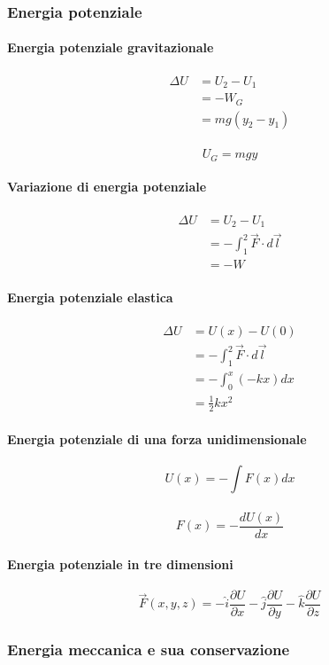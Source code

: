 \documentclass[a4paper,12pt]{article}
\theoremstyle{mystyle}
\begin{document}
\subsubsection{Energia potenziale}
\paragraph{Energia potenziale gravitazionale}
\[\begin{aligned}
    \Delta U & = U_2 - U_1\\
    &= - W_G \\
    &= mg (y_2-y_1)
\end{aligned}\]\\
\[U_G= mgy\]
\paragraph{Variazione di energia potenziale}
\[\begin{aligned}
    \Delta U &= U_2 - U_1\\
    &= - \int_1^2 \vec F \cdot d \vec l\\
    &= - W
\end{aligned}\]
\paragraph{Energia potenziale elastica}
\[\begin{aligned}
\Delta U &= U(x) - U(0) \\
&= - \int _1^2 \vec F \cdot d \vec l\\
&= - \int_0^x(-kx)dx \\
&= \frac{1}{2}kx^2
\end{aligned}\]
\paragraph{Energia potenziale di una forza unidimensionale}
\[U(x)= - \int F(x) dx\]\\
\[F(x)= - \frac{d U(x)}{dx}\]
\paragraph{Energia potenziale in tre dimensioni}
\[\vec F(x,y,z) = - \hat i \frac{\partial U}{\partial x} - \hat j \frac{\partial U}{\partial y} - \hat k \frac{\partial U}{\partial z}\]
\subsubsection{Energia meccanica e sua conservazione}
\end{document}
